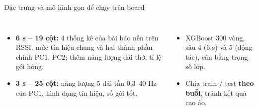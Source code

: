 \documentclass[aspectratio=169,10pt]{beamer}
\newcommand{\gon}[3]{%
  \node[anchor=west,font=\scriptsize\bfseries,text=navy] at (0,#1) {#2};
  \node[anchor=west,font=\LARGE\bfseries,text=navy] (g) at (0,#1-7mm) {#3};
  \node[anchor=base west,font=\tiny,text=xam] at (g.base east) {cột / board};}
\begin{document}
\begin{frame}{Đặc trưng và mô hình gọn để chạy trên board}
  \begin{columns}[T,onlytextwidth]
      \small
      \vskip4mm
      \small
      \begin{itemize}
        \item \textbf{6 s – 19 cột:} 4 thống kê của bài báo nền trên RSSI, mức tín hiệu chung và hai thành phần chính
          PC1, PC2; thêm năng lượng dải thở, tỉ lệ gói hỏng.
        \item \textbf{3 s – 25 cột:} năng lượng 5 dải tần 0,3–40 Hz của PC1, hình dạng tín hiệu, số gói tốt.
      \end{itemize}
      \vskip3mm
      \begin{itemize}
        \item XGBoost 300 vòng, sâu 4 (6 s) và 5 (động tác), cân bằng trọng số lớp.
        \item Chia train / test \textbf{theo buổi}, tránh kết quả cao ảo.
      \end{itemize}
  \end{columns}
\end{frame}
\end{document}
